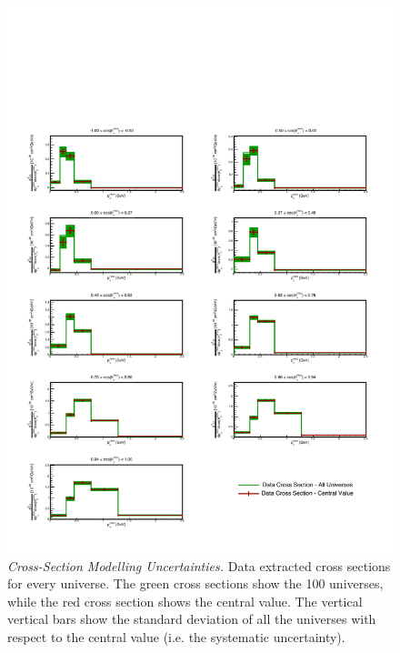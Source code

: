 \begin{figure}[]
\centering
\includegraphics[width=1.0\textwidth]{images/genie_covariance_plots/genie_multisim_muangle_mumom_xsec_all_fancy_2d}
\caption[Cross-Section Modelling Uncertainties - Double-Differential Cross Section - Universes Distributions]{\emph{Cross-Section Modelling Uncertainties.} Data extracted cross sections for every universe. The green cross sections show the 100 \g universes, while the red cross section shows the central value. The vertical vertical bars show the standard deviation of all the universes with respect to the central value (i.e. the systematic uncertainty).}
\label{fig:genie_multisim_muangle_mumom_xsec_all_fancy_2d}
\end{figure}

